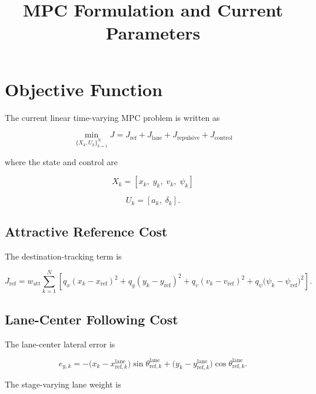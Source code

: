 \documentclass[11pt]{article}
\title{MPC Formulation and Current Parameters}
\author{}
\date{}
\begin{document}
\maketitle

\section{Objective Function}

The current linear time-varying MPC problem is written as

\begin{equation}
\min_{\{X_k,U_k\}_{k=1}^{N}} J
=
J_{\mathrm{ref}}
+
J_{\mathrm{lane}}
+
J_{\mathrm{repulsive}}
+
J_{\mathrm{control}}
\end{equation}

where the state and control are

\begin{equation}
X_k = [x_k,\; y_k,\; v_k,\; \psi_k]
\end{equation}

\begin{equation}
U_k = [a_k,\; \delta_k].
\end{equation}

\subsection{Attractive Reference Cost}

The destination-tracking term is

\begin{equation}
J_{\mathrm{ref}}
=
w_{\mathrm{att}}
\sum_{k=1}^{N}
\left[
q_x (x_k-x_{\mathrm{ref}})^2
+
q_y (y_k-y_{\mathrm{ref}})^2
+
q_v (v_k-v_{\mathrm{ref}})^2
+
q_{\psi}\big(\psi_k-\psi_{\mathrm{ref}}\big)^2
\right].
\end{equation}

\subsection{Lane-Center Following Cost}

The lane-center lateral error is

\begin{equation}
e_{y,k}
=
-
\big(x_k-x^{\mathrm{lane}}_{\mathrm{ref},k}\big)
\sin\theta^{\mathrm{lane}}_{\mathrm{ref},k}
+
\big(y_k-y^{\mathrm{lane}}_{\mathrm{ref},k}\big)
\cos\theta^{\mathrm{lane}}_{\mathrm{ref},k}.
\end{equation}

The stage-varying lane weight is
\end{document}
